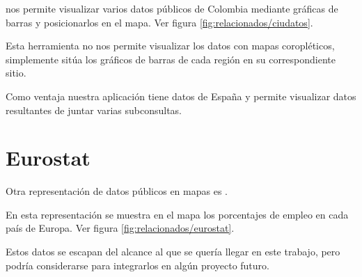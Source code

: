 nos permite visualizar varios datos públicos de Colombia mediante gráficas de barras y posicionarlos en el mapa. Ver figura \ref{fig:relacionados/ciudatos}.

Esta herramienta no nos permite visualizar los datos con mapas coropléticos, simplemente sitúa los gráficos de barras de cada región en su correspondiente sitio.

Como ventaja nuestra aplicación tiene datos de España y permite visualizar datos resultantes de juntar varias subconsultas.


\section{Eurostat}

Otra representación de datos públicos en mapas es .

En esta representación se muestra en el mapa los porcentajes de empleo en cada país de Europa. Ver figura \ref{fig:relacionados/eurostat}.

Estos datos se escapan del alcance al que se quería llegar en este trabajo, pero podría considerarse para integrarlos en algún proyecto futuro.

